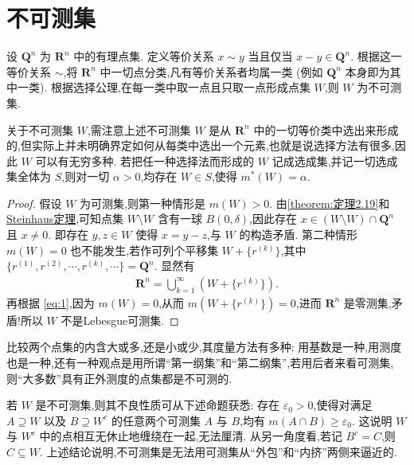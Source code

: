 \documentclass[../../main.tex]{subfiles}%
\begin{document}
\section{不可测集}

\begin{theorem}\label{theorem:不可测集}
设 \(\bm{Q}^n\) 为 \(\bm{R}^n\) 中的有理点集. 定义等价关系 \(x \sim y\) 当且仅当 \(x-y\in \bm{Q}^n\). 根据这一等价关系 \(\sim\),将 \(\bm{R}^n\) 中一切点分类,凡有等价关系者均属一类 (例如 \(\bm{Q}^n\) 本身即为其中一类). 根据选择公理,在每一类中取一点且只取一点形成点集 \(W\),则 \(W\) 为不可测集.
\end{theorem}
\begin{remark}
关于不可测集 \(W\),需注意上述不可测集 \(W\) 是从 \(\bm{R}^n\) 中的一切等价类中选出来形成的,但实际上并未明确界定如何从每类中选出一个元素,也就是说选择方法有很多,因此 \(W\) 可以有无穷多种. 若把任一种选择法而形成的 \(W\) 记成选成集,并记一切选成集全体为 \(S\),则对一切 \(\alpha > 0\),均存在 \(W\in S\),使得 \(m^*(W)=\alpha\).
\end{remark}
\begin{proof}
假设 \(W\) 为可测集,则第一种情形是 \(m(W) > 0\). 由\cref{theorem:定理2.19}和\hyperref[theorem:Steinhaus定理]{Steinhaus定理},可知点集 \(W \setminus W\) 含有一球 \(B(0, \delta)\),因此存在 \(x\in (W \setminus W)\cap \bm{Q}^n\) 且 \(x\neq 0\). 即存在 \(y,z\in W\) 使得 \(x=y-z\),与 \(W\) 的构造矛盾. 第二种情形 \(m(W)=0\) 也不能发生,若作可列个平移集 \(W+\{r^{(k)}\}\),其中 \(\{ r^{(1)}, r^{(2)}, \cdots, r^{(k)}, \cdots \} = \bm{Q}^n\). 显然有
\begin{align}
\bm{R}^n = \bigcup\limits_{k=1}^\infty (W+\{r^{(k)}\}). \label{eq:1}
\end{align}
再根据 \eqref{eq:1},因为 \(m(W)=0\),从而 \(m(W+\{r^{(k)}\})=0\),进而 \(\bm{R}^n\) 是零测集,矛盾!所以 \(W\) 不是Lebesgue可测集.
\end{proof}

比较两个点集的内含大或多,还是小或少,其度量方法有多种: 用基数是一种,用测度也是一种,还有一种观点是用所谓“第一纲集”和“第二纲集”,若用后者来看可测集,则“大多数”具有正外测度的点集都是不可测的.

若 \(W\) 是不可测集,则其不良性质可从下述命题获悉: 存在 \(\varepsilon_0 > 0\),使得对满足 \(A \supseteq W\) 以及 \(B \supseteq W^c\) 的任意两个可测集 \(A\) 与 \(B\),均有 \(m(A\cap B) \geqslant \varepsilon_0\). 这说明 \(W\) 与 \(W^c\) 中的点相互无休止地缠绕在一起,无法厘清. 从另一角度看,若记 \(B^c = C\),则 \(C \subseteq W\). 上述结论说明,不可测集是无法用可测集从“外包”和“内挤”两侧来逼近的.
\end{document}
